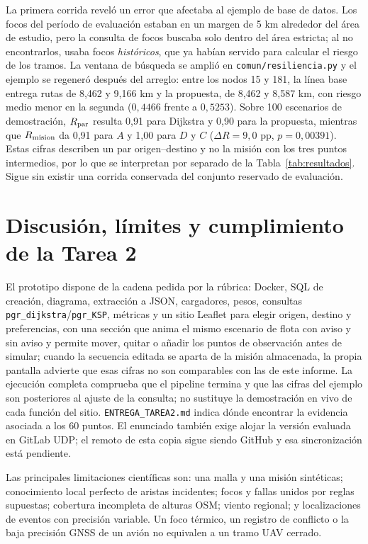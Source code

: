 \documentclass[journal,10pt]{IEEEtran}
\begin{document}
La primera corrida reveló un error que afectaba al ejemplo de base de datos.
Los focos del período de evaluación estaban en un margen de 5 km alrededor
del área de estudio, pero la consulta de focos buscaba solo dentro del área
estricta; al no encontrarlos, usaba focos \emph{históricos}, que ya habían
servido para calcular el riesgo de los tramos. La ventana de búsqueda se
amplió en \texttt{comun/resiliencia.py} y el ejemplo se regeneró después del
arreglo: entre los nodos 15 y 181, la línea base entrega rutas de 8,462 y
9,166 km y la propuesta, de 8,462 y 8,587 km, con riesgo medio menor en la
segunda ($0{,}4466$ frente a $0{,}5253$). Sobre 100 escenarios de demostración,
$R_{\rm par}$ resulta 0,91 para Dijkstra y 0,90 para la propuesta, mientras
que $R_{\rm mision}$ da 0,91 para $A$ y 1,00 para $D$ y $C$
($\Delta R=9{,}0$ pp, $p=0{,}00391$). Estas cifras describen un par
origen--destino y no la misión con los tres puntos intermedios, por lo que
se interpretan por separado de la Tabla~\ref{tab:resultados}. Sigue sin
existir una corrida conservada del conjunto reservado de evaluación.

\section{Discusión, límites y cumplimiento de la Tarea 2}

El prototipo dispone de la cadena pedida por la rúbrica: Docker, SQL de
creación, diagrama, extracción a JSON, cargadores, pesos, consultas
\texttt{pgr\_dijkstra}/\texttt{pgr\_KSP}, métricas y un sitio Leaflet para
elegir origen, destino y preferencias, con una sección que anima el mismo
escenario de flota con aviso y sin aviso y permite mover, quitar o añadir
los puntos de observación antes de simular; cuando la secuencia editada se
aparta de la misión almacenada, la propia pantalla advierte que esas cifras
no son comparables con las de este informe. La ejecución completa comprueba
que el pipeline termina y que las cifras del ejemplo son posteriores al
ajuste de la consulta; no sustituye la demostración en vivo de cada función
del sitio. \texttt{ENTREGA\_TAREA2.md} indica dónde encontrar la evidencia
asociada a los 60 puntos. El enunciado también exige alojar la versión
evaluada en GitLab UDP; el remoto de esta copia sigue siendo GitHub y esa
sincronización está pendiente.

Las principales limitaciones científicas son: una malla y una misión
sintéticas; conocimiento local perfecto de aristas incidentes; focos y
fallas unidos por reglas supuestas; cobertura incompleta de alturas OSM;
viento regional; y localizaciones de eventos con precisión variable. Un foco
térmico, un registro de conflicto o la baja precisión GNSS de un avión no
equivalen a un tramo UAV cerrado.
\end{document}
